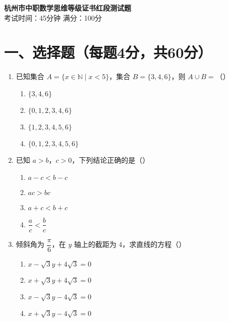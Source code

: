 \documentclass[12pt,a4paper]{ctexart}
\begin{document}
\begin{center}
    \LARGE \textbf{杭州市中职数学思维等级证书红段测试题}\\[6pt]
    \large 考试时间：45分钟 \quad 满分：100分
\end{center}

\vspace{1em}

\section*{一、选择题（每题4分，共60分）}

\begin{enumerate}
    \item 已知集合 $A = \{x \in \mathbb{N} \mid x < 5\}$，集合 $B = \{3,4,6\}$，则 $A \cup B =$（）
    \begin{multicols}{4}
    \begin{enumerate}
        \item $\{3,4,6\}$ 
        \item $\{0,1,2,3,4,6\}$ 
        \item $\{1,2,3,4,5,6\}$ 
        \item $\{0,1,2,3,4,5,6\}$
    \end{enumerate}
    \end{multicols}

    \item 已知 $a > b$，$c > 0$，下列结论正确的是（）
    \begin{multicols}{2}
    \begin{enumerate}
        \item $a - c < b - c$
        \item $ac > bc$
        \item $a + c < b + c$
        \item $\dfrac{a}{c} < \dfrac{b}{c}$
    \end{enumerate}
    \end{multicols}

    \item 倾斜角为 $\dfrac{\pi}{6}$，在 $y$ 轴上的截距为 $4$，求直线的方程（）
    \begin{multicols}{2}
    \begin{enumerate}
        \item $x - \sqrt{3}y + 4\sqrt{3} = 0$
        \item $x + \sqrt{3}y + 4\sqrt{3} = 0$
        \item $x - \sqrt{3}y - 4\sqrt{3} = 0$
        \item $x + \sqrt{3}y - 4\sqrt{3} = 0$
    \end{enumerate}
    \end{multicols}


\end{enumerate}
\end{document}
